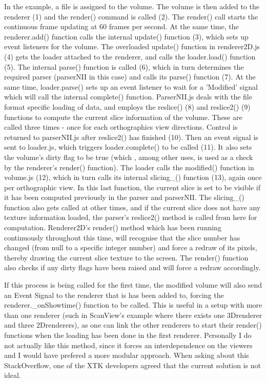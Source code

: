 \documentclass[a4paper,11pt,twoside]{article}
\begin{document}
In the example, a file is assigned to the volume. The volume is then added to the renderer (1) and the render() command is called (2). The render() call starts the continuous frame updating at 60 frames per second. At the same time, the renderer.add() function calls the internal update() function (3), which sets up event listeners for the volume. The overloaded update() function in renderer2D.js (4) gets the loader attached to the renderer, and calls the loader.load() function (5). The internal parse() function is called (6), which in turn determines the required parser (parserNII in this case) and calls its parse() function (7). At the same time, loader.parse() sets up an event listener to wait for a 'Modified' signal which will call the internal complete() function. ParserNII.js deals with the file format specific loading of data, and employs the reslice() (8) and reslice2() (9) functions to compute the current slice information of the volume. These are called three times - once for each orthographics view directions. Control is returned to parserNII.js after reslice2() has finished (10). Then an event signal is sent to loader.js, which triggers loader.complete() to be called (11). It also sets the volume's dirty flag to be true (which , among other uses, is used as a check by the renderer's render() function). The loader calls the modified() function in volume.js (12), which in turn calls its internal slicing\_() function (13), again once per orthographic view. In this last function, the current slice is set to be visible if it has been computed previously in the parser and parserNII. The slicing\_() function also gets called at other times, and if the current slice does not have any texture information loaded, the parser's reslice2() method is called from here for computation. Renderer2D's render() method which has been running continuously throughout this time, will recognise that the slice number has changed (from null to a specific integer number) and force a redraw of its pixels, thereby drawing the current slice texture to the screen. The render() function also checks if any dirty flags have been raised and will force a redraw accordingly.

If this process is being called for the first time, the modified volume will also send an Event Signal to the renderer that is has been added to, forcing the renderer.\_onShowtime() function to be called. This is useful in a setup with more than one renderer (such in ScanView's example where there exists one 3Drenderer and three 2Drenderers), as one can link the other renderers to start their render() functions when the loading has been done in the first renderer. Personally I do not actually like this method, since it forces an interdependence on the viewers and I would have prefered a more modular approach. When asking about this StackOverflow, one of the XTK developers agreed that the current solution is not ideal.
\end{document}
